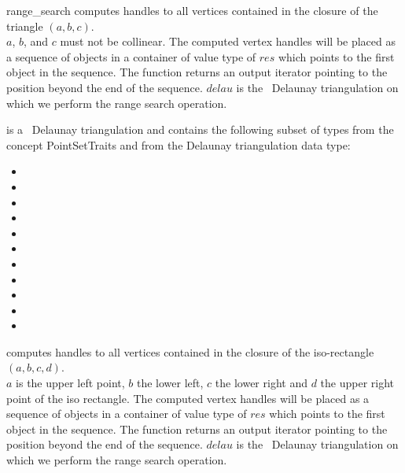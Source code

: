 \begin{ccRefFunction}{range_search}
{computes handles to all vertices contained in the closure of the triangle $(a,b,c)$.\\
\ccPrecond $a$, $b$, and $c$ must not be collinear. 
The computed vertex handles will be placed as a sequence of objects in a container of value type
of $res$
which points to the first object in the sequence. The function
returns an output iterator pointing to the position beyond the end
of the sequence. 
$delau$ is the \cgal\ Delaunay triangulation on which we perform the range search operation.}

 is a \cgal\ Delaunay triangulation and contains the following subset of types from the concept PointSetTraits and from
the Delaunay triangulation data type:
\begin{itemize}
  \item {} 
  \item {}
  \item {} 
  \item {}   
  \item {} 
  \item {}  
  \item {}  
  \item {} 
  \item {} 
  \item {} 
  \item {}  
\end{itemize}


{computes handles to all vertices contained in the closure of the iso-rectangle $(a,b,c,d)$.\\
\ccPrecond $a$ is the upper left point, $b$ the lower left, $c$ the lower
right and $d$ the upper right point of the iso rectangle.
The computed vertex handles will be placed as a sequence of objects in a container of value type
of $res$
which points to the first object in the sequence. The function
returns an output iterator pointing to the position beyond the end
of the sequence. $delau$ is the \cgal\ Delaunay triangulation on which we perform the range search operation.} 


\end{ccRefFunction}
